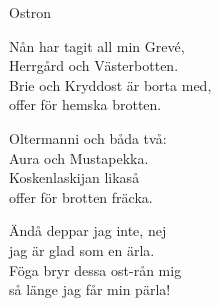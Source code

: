 \begin{song}{Ostron}
	

	
	
	Nån har tagit all min Grevé,\\
	Herrgård och Västerbotten.\\
	Brie och Kryddost är borta med,\\
	offer för hemska brotten.
	
	Oltermanni och båda två:\\
	Aura och Mustapekka.\\
	Koskenlaskijan likaså\\
	offer för brotten fräcka.
	
	Ändå deppar jag inte, nej\\
	jag är glad som en ärla.\\
	Föga bryr dessa ost-rån mig\\
	så länge jag får min pärla!
	
\end{song}
